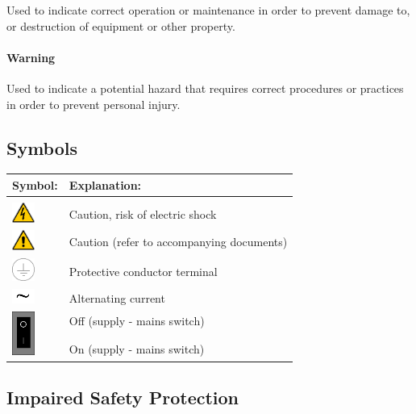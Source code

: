 Used to indicate correct operation or maintenance in order to prevent damage to, or destruction of equipment or other property.

\paragraph{Warning}

Used to indicate a potential hazard that requires correct procedures or practices in order to prevent personal injury.

\subsection{Symbols}
\begin{tabular}{l|l}
	\hline
	\textbf{Symbol:} & \textbf{Explanation:} \\
	\hline
	& \\
	\includegraphics[width=2em]{fig/hazard} & Caution, risk of electric shock\\
	\includegraphics[width=2em]{fig/caution} & Caution (refer to accompanying documents)\\
	\includegraphics[width=2em]{fig/ground_symbol} & Protective conductor terminal\\
	\includegraphics[width=2em]{fig/AC_symbol} & Alternating current\\
	\multirow{3}{*}{\includegraphics[width=2em]{fig/on_off_switch}} 	& Off (supply - mains switch)\\
																																		&														\\
																																		& On (supply - mains switch)\\
\end{tabular}

\subsection{Impaired Safety Protection}

